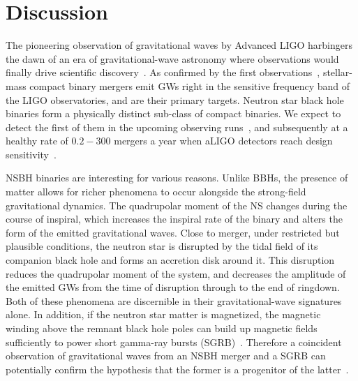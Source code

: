 \documentclass[aps,prd,amsmath,floats,floatfix, twocolumn,
superscriptaddress,nofootinbib,showpacs]{revtex4-1}
\begin{document}
\section{Discussion}\label{s1:discussion}


The pioneering observation of gravitational waves by Advanced LIGO
harbingers the dawn of an era of gravitational-wave astronomy where observations
would finally drive scientific discovery~\cite{Abbott:2016blz}. As confirmed by
the first observations~\cite{Abbott:2016blz,Abbott:2016nmj,Abbott:2016nhf},
stellar-mass compact binary mergers emit GWs right in the sensitive frequency
band of the LIGO observatories, and are their primary targets.
Neutron star black hole binaries form a physically distinct sub-class of
compact binaries. We expect to detect the first of them in the upcoming
observing runs~\cite{Abbott:2016ymx}, and subsequently at a healthy rate of
$0.2-300$ mergers a year when aLIGO detectors reach design
sensitivity~\cite{Abadie:2010cf}.

NSBH binaries are interesting for various reasons. Unlike BBHs, the presence of
matter allows for richer phenomena to occur alongside the strong-field
gravitational dynamics. The quadrupolar moment of the NS changes during the
course of inspiral, which increases the inspiral rate of the binary and alters the
form of the emitted gravitational waves. Close to merger, under restricted but
plausible conditions, the neutron star is disrupted by the tidal field of its 
companion black hole and forms an accretion disk around it. This disruption
reduces the quadrupolar moment of the system, and decreases the amplitude of
the emitted GWs from the time of disruption through to the end of ringdown.
Both of these phenomena are discernible in their gravitational-wave signatures
alone. In addition, if the neutron star matter is magnetized, the magnetic
winding above the remnant black hole poles can build up magnetic fields
sufficiently to power short gamma-ray bursts (SGRB)~\cite{Foucart:2015a,
Lovelace:2013vma,Deaton2013,Foucart2012,Shibata:2005mz,Paschalidis2014}.
Therefore a coincident observation of gravitational waves from an NSBH merger
and a SGRB can potentially confirm the hypothesis that the former is a
progenitor of the latter~\cite{eichler:89,1992ApJ...395L..83N,moch:93,
Barthelmy:2005bx,2005Natur.437..845F,2005Natur.437..851G,Shibata:2005mz,
Tanvir:2013,Paschalidis2014}.
\end{document}
